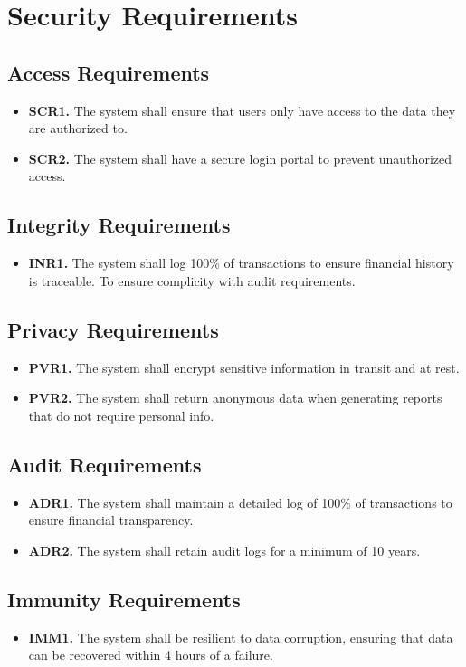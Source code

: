 \documentclass[12pt]{article}
\begin{document}
\section{Security Requirements}
\subsection{Access Requirements}
\begin{itemize}
    \item \textbf{SCR1.} The system shall ensure that users only have access to the data they are authorized to.
    \item \textbf{SCR2.} The system shall have a secure login portal to prevent unauthorized access.
\end{itemize}

\subsection{Integrity Requirements}
\begin{itemize}
    \item \textbf{INR1.} The system shall log 100\% of transactions to ensure financial history is traceable. To ensure complicity with audit requirements.
\end{itemize}
\subsection{Privacy Requirements}
\begin{itemize}
    \item \textbf{PVR1.} The system shall encrypt sensitive information in transit and at rest.
    \item \textbf{PVR2.} The system shall return anonymous data when generating reports that do not require personal info.
\end{itemize}
\subsection{Audit Requirements}
\begin{itemize}
    \item \textbf{ADR1.} The system shall maintain a detailed log of 100\% of transactions to ensure financial transparency.
    \item \textbf{ADR2.} The system shall retain audit logs for a minimum of 10 years.
\end{itemize}
\subsection{Immunity Requirements}
\begin{itemize}
    \item \textbf{IMM1.} The system shall be resilient to data corruption, ensuring that data can be recovered within 4 hours of a failure.
\end{itemize}
\end{document}
